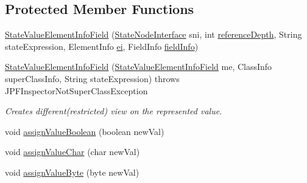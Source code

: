 \subsection*{Protected Member Functions}
\begin{DoxyCompactItemize}
\item 
\hyperlink{classgov_1_1nasa_1_1jpf_1_1inspector_1_1server_1_1programstate_1_1_state_value_element_info_field_ac65dc79fdf2ab5be6383c21430dd1a90}{State\+Value\+Element\+Info\+Field} (\hyperlink{interfacegov_1_1nasa_1_1jpf_1_1inspector_1_1server_1_1programstate_1_1_state_node_interface}{State\+Node\+Interface} sni, int \hyperlink{classgov_1_1nasa_1_1jpf_1_1inspector_1_1server_1_1programstate_1_1_state_node_a55683618625dae46e8aa68d95811d6bb}{reference\+Depth}, String state\+Expression, Element\+Info \hyperlink{classgov_1_1nasa_1_1jpf_1_1inspector_1_1server_1_1programstate_1_1_state_value_element_info_field_a5e6f3ff034c98330007fe320eb5ec253}{ei}, Field\+Info \hyperlink{classgov_1_1nasa_1_1jpf_1_1inspector_1_1server_1_1programstate_1_1_state_value_element_info_field_a5688eca8dae926e6e6a8b50aeab0c279}{field\+Info})
\item 
\hyperlink{classgov_1_1nasa_1_1jpf_1_1inspector_1_1server_1_1programstate_1_1_state_value_element_info_field_a286e24b4e618aa88b27a07240afa2e62}{State\+Value\+Element\+Info\+Field} (\hyperlink{classgov_1_1nasa_1_1jpf_1_1inspector_1_1server_1_1programstate_1_1_state_value_element_info_field}{State\+Value\+Element\+Info\+Field} me, Class\+Info super\+Class\+Info, String state\+Expression)  throws J\+P\+F\+Inspector\+Not\+Super\+Class\+Exception 
\begin{DoxyCompactList}\small\item\em Creates different(restricted) view on the represented value. \end{DoxyCompactList}\item 
void \hyperlink{classgov_1_1nasa_1_1jpf_1_1inspector_1_1server_1_1programstate_1_1_state_value_element_info_field_a3260083c9a75954ba63aa5dc0279867e}{assign\+Value\+Boolean} (boolean new\+Val)
\item 
void \hyperlink{classgov_1_1nasa_1_1jpf_1_1inspector_1_1server_1_1programstate_1_1_state_value_element_info_field_a4509be26cce2dad7812926575126d8c4}{assign\+Value\+Char} (char new\+Val)
\item 
void \hyperlink{classgov_1_1nasa_1_1jpf_1_1inspector_1_1server_1_1programstate_1_1_state_value_element_info_field_a4545367c49c3c1b7783779f0714d3990}{assign\+Value\+Byte} (byte new\+Val)
\item 

\end{DoxyCompactItemize}
